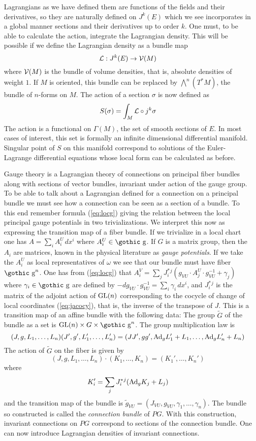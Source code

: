 \documentclass[12pt,titlepage]{article}
\def\goth#1{\hbox{\gothic #1}}
\def\cL{{\cal L}}
\def\cV{{\cal V}}
\def\gg{{\goth g}}
\def\Ad{\hbox{Ad}}
\def\GL{\hbox{GL}}
\begin{document}
Lagrangians as we have defined them are functions of the fields and
their derivatives, so they are naturally defined 
on \(J^k(E)\)
which we see incorporates in a global manner sections and their 
derivatives up to order \(k\). One must, 
to be able to calculate the action, integrate the
Lagrangian density. This will be possible if we define the Lagrangian
density as a bundle map
\[%
\cL: J^k(E) \to \cV(M)
\]%
where \(\cV(M)\)  is the bundle of volume densities, that is, absolute
densities of weight
\(1\). If \(M\) is oriented, this bundle can be replaced by
\(\bigwedge^n(T^*M)\), the bundle of \(n\)-forms on \(M\).  The
action of a section \(\sigma\) is now defined as
\begin{equation}%
S(\sigma) = \int_M \cL\circ j^k\sigma
\end{equation}%
The action is a functional on \(\Gamma(M)\), the set of smooth sections
of \(E\). In most cases of interest, this set is formally an infinite
dimensional differential
manifold.  Singular point of \(S\) on this manifold correspond to
solutions of the Euler-Lagrange differential equations
whose local form can be calculated as before.

Gauge theory is a Lagrangian theory of connections on principal fiber
bundles along with sections of vector bundles, invariant under action of
the gauge group. To be able to talk about a Lagrangian defined for a
connection on a principal bundle we must see how a connection can be
seen as a section of a bundle. To this end remember formula
(\ref{eq:locg}) giving the relation between the local principal gauge
potentials in two trivializations. We interpret this now as expressing the
transition map of a fiber bundle. If we trivialize in a local chart one
has  \(A  = \sum_iA_i^U\,dx^i\) where \(A_i^U \in \gg\). If \(G\) is a 
matrix group, then the \(A_i\) are matrices, known in the physical
literature  as {\em gauge potentials\/}. 
%
If we
take the \(A_i^U\) as local representatives of \(\omega\) we see that
our bundle must have fiber \(\gg^n\). One has from (\ref{eq:locg}) that
\(A_i^V = \sum_j J^*_i{}^j (g_{VU}\cdot A_j^U\cdot
g_{VU}^{-1} + \gamma_j)\) 
where \(\gamma_i\in\gg\) are defined by \(-dg_{VU}\cdot
g_{VU}^{-1} = \sum_i \gamma_i\, dx^i\), and \(J^*_i{}^j\) is the matrix of
the adjoint action of 
\(\GL(n)\) corresponding to the 
cocycle of change of local coordinates (\ref{eq:jacocy}), that is,
the inverse of the transpose of \(J\).
This is a transition map of an affine 
bundle with the following data: The group \(\tilde G\) of the bundle as
a set is
\(\GL(n) \times G \times \gg^n\). The group multiplication law is
\[
(J,g,L_1,\dots,L_n)(J',g',L_1',\dots,L_n') = (JJ', gg', \Ad_g
L_1'+L_1,\dots,\Ad_gL_n'+L_n)
\]
The action of \(\tilde G\) on the fiber
is given by 
\[
(J,g,L_1,\dots,L_n) \cdot (K_1,\dots,K_n) =
(K_1',\dots,K_n')
\]
 where 
\[
K_i' = \sum_j J^*_i{}^j(\Ad_gK_j + L_j)
\]
 and
the transition map of the bundle is \(\tilde g_{VU} = (J_{VU}, g_{VU},
\gamma_1,\dots,\gamma_n)\). The bundle so constructed is called the {\em
connection bundle\/} 
%
of \(PG\). With this construction, invariant
connections on \(PG\) correspond to sections of the connection bundle.
One can now introduce Lagrangian densities of invariant connections.
\end{document}
